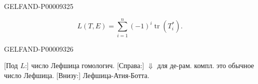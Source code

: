 \begin{GelfandAdjacentEvidence}{GELFAND-P000093}{25}

\begin{equation*}
L(T,E)=\sum_{i=1}^{n}(-1)^i\operatorname{tr}(T_i^*).
\end{equation*}
\end{GelfandAdjacentEvidence}
\begin{GelfandAdjacentEvidence}{GELFAND-P000093}{26}

[Под $L$:] число Лефшица гомологич.
[Справа:] $\Downarrow$ для де-рам. компл. это обычное число Лефшица.
[Внизу:] Лефшица-Атия-Ботта.
\end{GelfandAdjacentEvidence}




